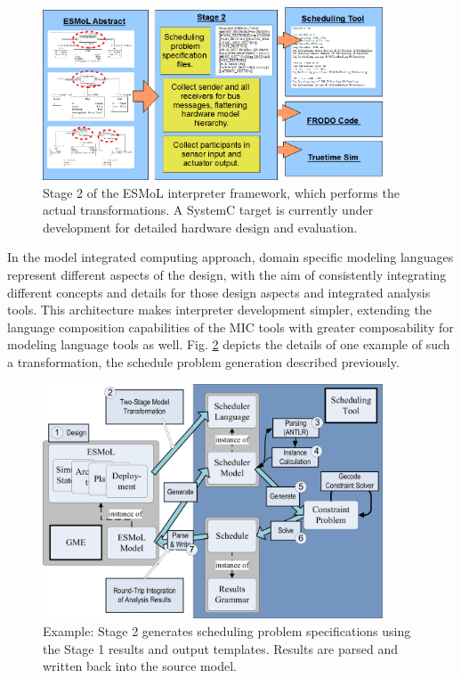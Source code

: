 \begin{figure}[thpb]
\centering
\includegraphics[width=0.9\textwidth]{img/stage2}
\caption{Stage 2 of the ESMoL interpreter framework, which performs the actual transformations. A SystemC target is currently under development for detailed hardware design and evaluation.} 
\label{fig:stage2}
\end{figure}

In the model integrated computing approach, domain specific 
modeling languages represent different aspects of the design, 
with the aim  of consistently integrating different concepts 
and details for those design aspects and integrated analysis tools.
This architecture makes interpreter development simpler, extending the language composition
capabilities of the MIC tools with greater composability for modeling language tools as well.
Fig. \ref{fig:sched_integration} depicts the details of one example of such a
transformation, the schedule problem generation described previously.

\begin{figure}[thpb]
\centering
\includegraphics[width=0.9\textwidth]{img/sched_integration}
\caption{Example: Stage 2 generates scheduling problem specifications using the Stage 1 results and output templates. Results are parsed and written back into the source model.} 
\label{fig:sched_integration}
\end{figure}


